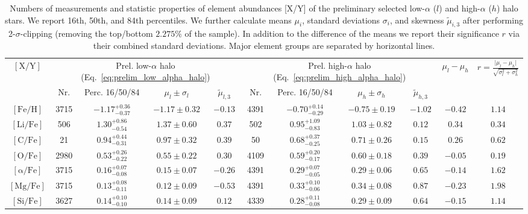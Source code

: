 \begingroup
\renewcommand{\arraystretch}{1.19}
\begin{table*}
\centering
\caption{Numbers of measurements and statistic properties of element abundances [X/Y] of the preliminary selected low-$\alpha$ ($l$) and high-$\alpha$ ($h$) halo stars. We report 16th, 50th, and 84th percentiles. We further calculate means $\mu_i$, standard deviations $\sigma_i$, and skewness $\tilde{\mu}_{i,3}$ after performing 2-$\sigma$-clipping (removing the top/bottom $2.275\%$ of the sample). In addition to the difference of the means we report their significance $r$ via their combined standard deviations. Major element groups are separated by horizontal lines.}
\label{tab:xfe_percentiles}
\begin{tabular}{c|cccc|cccc|cc}
\hline \hline
\multirow{2}{*}{$\mathrm{[X/Y]}$} & \multicolumn{4}{c}{Prel. low-$\alpha$ halo (Eq.~\protect\ref{eq:prelim_low_alpha_halo})} & \multicolumn{4}{c}{Prel. high-$\alpha$ halo (Eq.~\protect\ref{eq:prelim_high_alpha_halo})} & \multirow{2}{*}{$\mu_l - \mu_h$} & \multirow{2}{*}{$r = \frac{\vert \mu_l - \mu_h \vert}{\sqrt{\sigma_l^2 + \sigma_h^2}}$}\\
 & Nr. & Perc. 16/50/84 & $\mu_l \pm \sigma_l$ & $\tilde{\mu}_{l,3}$ & Nr. & Perc. 16/50/84 & $\mu_h \pm \sigma_h$ & $\tilde{\mu}_{h,3}$ & &  \\
\hline
$\mathrm{[Fe/H]}$ & 3715 & $-1.17_{-0.37}^{+0.36}$ & $-1.17 \pm 0.32$ & $-0.13$ & 4391 & $-0.70_{-0.29}^{+0.14}$ & $-0.75 \pm 0.19$ & $-1.02$ & $-0.42$ & $1.14$  \\
\hline
$\mathrm{[Li/Fe]}$ & 506 & $1.30_{-0.54}^{+0.86}$ & $1.37 \pm 0.60$ & $0.37$ & 502 & $0.95_{-0.83}^{+1.09}$ & $1.03 \pm 0.82$ & $0.12$ & $0.34$ & $0.34$  \\
$\mathrm{[C/Fe]}$ & 21 & $0.94_{-0.31}^{+0.44}$ & $0.97 \pm 0.32$ & $0.39$ & 50 & $0.68_{-0.25}^{+0.37}$ & $0.71 \pm 0.26$ & $0.15$ & $0.26$ & $0.62$  \\
$\mathrm{[O/Fe]}$ & 2980 & $0.53_{-0.22}^{+0.26}$ & $0.55 \pm 0.22$ & $0.30$ & 4109 & $0.59_{-0.17}^{+0.20}$ & $0.60 \pm 0.18$ & $0.39$ & $-0.05$ & $0.19$  \\
\hline
$\mathrm{[\alpha/Fe]}$ & 3715 & $0.16_{-0.08}^{+0.07}$ & $0.15 \pm 0.07$ & $-0.26$ & 4391 & $0.29_{-0.05}^{+0.07}$ & $0.29 \pm 0.06$ & $0.65$ & $-0.14$ & $1.62$  \\
$\mathrm{[Mg/Fe]}$ & 3715 & $0.13_{-0.11}^{+0.08}$ & $0.12 \pm 0.09$ & $-0.53$ & 4391 & $0.33_{-0.06}^{+0.10}$ & $0.34 \pm 0.08$ & $0.87$ & $-0.23$ & $1.98$  \\
$\mathrm{[Si/Fe]}$ & 3627 & $0.14_{-0.10}^{+0.10}$ & $0.14 \pm 0.09$ & $0.12$ & 4339 & $0.28_{-0.08}^{+0.11}$ & $0.29 \pm 0.09$ & $0.64$ & $-0.15$ & $1.14$  \\

\end{tabular}
\end{table*}

